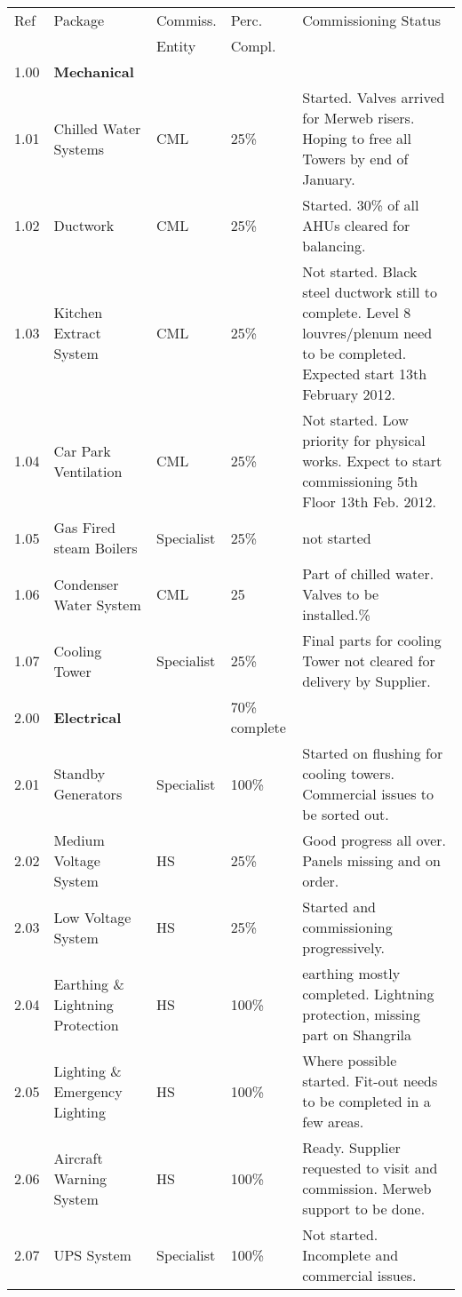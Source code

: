 
\bgroup
\small
\label{chap:listofservices}

\begin{longtable}{llllp{3.9cm}}
\toprule
Ref	&Package	&Commiss.	&Perc. & Commissioning Status\\
     &         &Entity    &Compl.\\
\midrule
1.00	&\textbf{Mechanical}	&	&\\
1.01	&Chilled Water Systems	&CML	&25\% & Started. Valves arrived for Merweb risers. Hoping to free all Towers by end of January. \\
1.02	&Ductwork  &CML		&25\%  & Started. 30\% of all AHUs cleared for balancing.\\
1.03  &Kitchen Extract System &CML &25\% &Not started. Black steel ductwork still to complete. Level 8 louvres/plenum need to be completed. Expected start 13th February 2012.\\
1.04	&Car Park Ventilation 	&CML &25\% &Not started. Low priority for physical works. Expect to start commissioning 5th Floor 13th Feb. 2012.\\
1.05	&Gas Fired steam Boilers &Specialist&25\% &not started\\	
1.06	&Condenser Water System 	&CML&25 & Part of chilled water. Valves to be installed.\%     \\
1.07    &Cooling Tower &Specialist&25\% & Final parts for cooling Tower not cleared for delivery by Supplier. \\
\midrule
2.00	&\textbf{Electrical}		&& 70\% complete\\
2.01	&Standby Generators	&Specialist&100\% & Started on flushing for cooling towers. Commercial issues to be sorted out.\\	
2.02	&Medium Voltage System	&HS&25\% & Good progress all over. Panels missing and on order.\\	
2.03	&Low Voltage System		&HS&25\% & Started and commissioning progressively.\\
2.04	&Earthing \& Lightning Protection &HS&100\% &earthing mostly completed. Lightning protection, missing part on Shangrila\\		
2.05	&Lighting \& Emergency Lighting  &HS&100\% & Where possible started. Fit-out needs to be completed in a few areas.\\		
2.06	&Aircraft Warning System &HS&100\% & Ready. Supplier requested to visit and commission. Merweb support to be done.\\		
2.07	&UPS System	&Specialist&100\% & Not started. Incomplete and commercial issues.\\	

\end{longtable}
